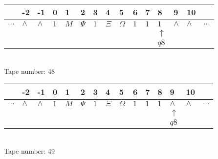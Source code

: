 \documentclass{article}
\begin{document}
\begin{table}[H]
\centering
\begin{tabular}{lllllllllllllll}
 & -2 & -1 & 0 & 1 & 2 & 3 & 4 & 5 & 6 & 7 & 8 & 9 & 10 & \\
\hline
$...$ & \multicolumn{1}{|l|}{$\wedge$} & \multicolumn{1}{|l|}{$\wedge$} & \multicolumn{1}{|l|}{$1$} & \multicolumn{1}{|l|}{$M$} & \multicolumn{1}{|l|}{$\Psi$} & \multicolumn{1}{|l|}{$1$} & \multicolumn{1}{|l|}{$\Xi$} & \multicolumn{1}{|l|}{$\Omega$} & \multicolumn{1}{|l|}{$1$} & \multicolumn{1}{|l|}{$1$} & \multicolumn{1}{|l|}{$1$} & \multicolumn{1}{|l|}{$\wedge$} & \multicolumn{1}{|l|}{$\wedge$} & $...$\\
\hline
&  &  &  &  &  &  &  &  &  &  & $\uparrow$ &  &  &  \\
&  &  &  &  &  &  &  &  &  &  & $ q8 $ &  &  &  \\
\end{tabular}
\\
Tape number: 48
\noindent\makebox[\linewidth]{\hdashrule{\textwidth}{1pt}{1pt}}\end{table}
\clearpage

\begin{table}[H]
\centering
\begin{tabular}{lllllllllllllll}
 & -2 & -1 & 0 & 1 & 2 & 3 & 4 & 5 & 6 & 7 & 8 & 9 & 10 & \\
\hline
$...$ & \multicolumn{1}{|l|}{$\wedge$} & \multicolumn{1}{|l|}{$\wedge$} & \multicolumn{1}{|l|}{$1$} & \multicolumn{1}{|l|}{$M$} & \multicolumn{1}{|l|}{$\Psi$} & \multicolumn{1}{|l|}{$1$} & \multicolumn{1}{|l|}{$\Xi$} & \multicolumn{1}{|l|}{$\Omega$} & \multicolumn{1}{|l|}{$1$} & \multicolumn{1}{|l|}{$1$} & \multicolumn{1}{|l|}{$1$} & \multicolumn{1}{|l|}{$\wedge$} & \multicolumn{1}{|l|}{$\wedge$} & $...$\\
\hline
&  &  &  &  &  &  &  &  &  &  &  & $\uparrow$ &  &  \\
&  &  &  &  &  &  &  &  &  &  &  & $ q8 $ &  &  \\
\end{tabular}
\\
Tape number: 49
\noindent\makebox[\linewidth]{\hdashrule{\textwidth}{1pt}{1pt}}\end{table}
\end{document}
